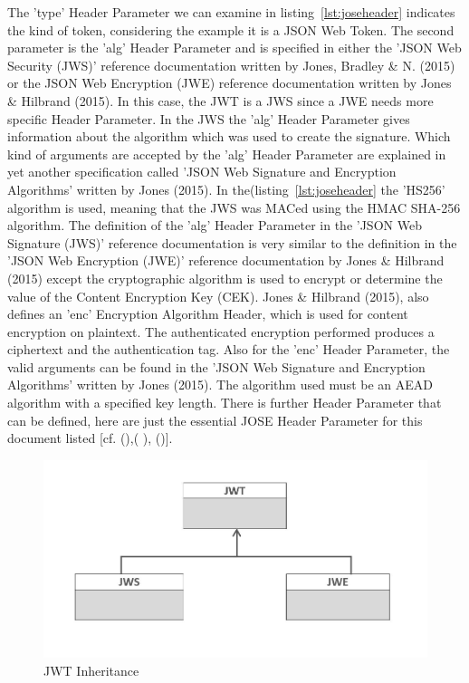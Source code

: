 The 'type' Header Parameter we can examine in listing~\ref{lst:joseheader} indicates the kind of token, considering the example it is a JSON Web Token. The second parameter is the 'alg' Header Parameter and is specified in either the 'JSON Web Security (JWS)' reference documentation written by Jones, Bradley \& N. (2015) or the JSON Web Encryption (JWE) reference documentation written by Jones \& Hilbrand (2015). In this case, the JWT is a JWS since a JWE needs more specific Header Parameter. In the JWS the 'alg' Header Parameter gives information about the algorithm which was used to create the signature. Which kind of arguments are accepted by the 'alg' Header Parameter are explained in yet another specification called 'JSON Web Signature and Encryption Algorithms' written by Jones (2015). In the(listing~\ref{lst:joseheader} the 'HS256' algorithm is used, meaning that the JWS was MACed using the HMAC SHA-256 algorithm. The definition of the 'alg' Header Parameter in the 'JSON Web Signature (JWS)' reference documentation is very similar to the definition in the 'JSON Web Encryption (JWE)' reference documentation by Jones \& Hilbrand (2015) except the cryptographic algorithm is used to encrypt or determine the value of the Content Encryption Key (CEK). Jones \& Hilbrand (2015), also defines an 'enc' Encryption Algorithm Header, which is used for content encryption on plaintext. The authenticated encryption performed produces a ciphertext and the authentication tag. Also for the 'enc' Header Parameter, the valid arguments can be found in the 'JSON Web Signature and Encryption Algorithms' written by Jones (2015). The algorithm used must be an AEAD algorithm with a specified key length. There is further Header Parameter that can be defined, here are just the essential JOSE Header Parameter for this document listed [cf. (\cite{JWE:IETF:Jones:2015}),( \cite{JWA:Jones:2015}), (\cite{JWS:IETF:Jones:2015})]. 

\begin{figure}[h]
	\centering
	\includegraphics[width=0.8\linewidth]{images/jwtjwsjwe2}
	\caption{JWT Inheritance}
	\label{fig:jwtjwsjwe2}
\end{figure}


